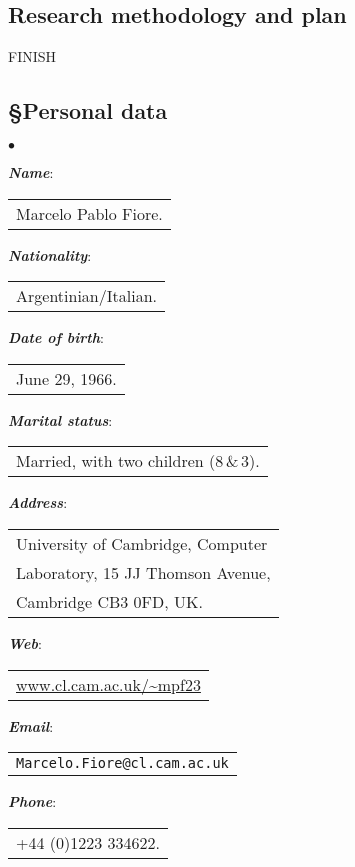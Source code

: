 \documentclass[11pt,twocolumn]{article}
\newenvironment{myitemize}
  {\begin{list}{$\bullet$}
  {\setlength{\topsep}{1pt}
   \setlength{\partopsep}{1pt}
   \setlength{\itemsep}{0pt}
   \setlength{\parsep}{0pt}
   \setlength{\leftmargin}{1em}
   \setlength{\labelwidth}{.5em}}}
  {\end{list}}
\begin{document}
\subsection{Research methodology and plan}

{\color{red}FINISH}

\clearpage
\setcounter{page}{1}

\subsection*{\S\enspace\thinspace Personal data}

\begin{myitemize}
\item
\textbf{\em Name}: 
\begin{tabular}[t]{l}
  Marcelo Pablo Fiore.
\end{tabular}

\item
\textbf{\em Nationality}: 
\begin{tabular}[t]{l}
  Argentinian/Italian.
\end{tabular}

\item
\textbf{\em Date of birth}: 
\begin{tabular}[t]{l}
  June 29, 1966.
\end{tabular}

\item
\textbf{\em Marital status}: 
\begin{tabular}[t]{l}
  Married, with two children (8\,\&\,3).
\end{tabular}

\item
\textbf{\em Address}: 
\begin{tabular}[t]{l}
  University of Cambridge, 
  Computer\\ Laboratory, 15 JJ Thomson
  Avenue,\\ Cambridge CB3 0FD, UK.
\end{tabular}

\item
\textbf{\em Web}: 
\begin{tabular}[t]{l}\small
  \url{www.cl.cam.ac.uk/~mpf23}
\end{tabular}

\item
\textbf{\em Email}: 
\begin{tabular}[t]{l}\small
  \texttt{Marcelo.Fiore@cl.cam.ac.uk}
\end{tabular}

\item
\textbf{\em Phone}: 
\begin{tabular}[t]{l}
  +44 (0)1223 334622.
\end{tabular}
\end{myitemize}
\end{document}
